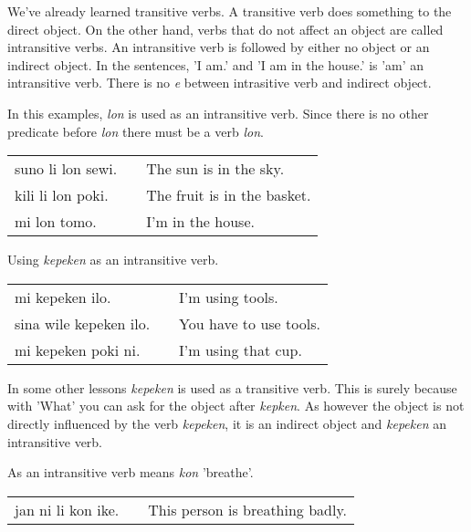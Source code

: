 We've already learned transitive verbs. 
A transitive verb does something to the direct object. 
On the other hand, verbs that do not affect an object are called intransitive verbs. 
An intransitive verb is followed by either no object or an indirect object. 
In the sentences, 'I am.' and 'I am in the house.' is 'am' an intransitive verb. 
There is no \textit{e} between intrasitive verb and indirect object.

%
In this examples, \textit{lon} is used as an intransitive verb. 
Since there is no other predicate before \textit{lon} there must be a verb \textit{lon}.

\begin{supertabular}{p{5,5cm}|ll}
suno li lon sewi. && The sun is in the sky. \\
kili li lon poki. && The fruit is in the basket. \\
mi lon tomo. && I'm in the house. \\
\end{supertabular} 

%
Using \textit{kepeken} as an intransitive verb.
 
\begin{supertabular}{p{5,5cm}|ll}
mi kepeken ilo. && I'm using tools. \\
sina wile kepeken ilo. && You have to use tools. \\
mi kepeken poki ni. && I'm using that cup. \\
\end{supertabular} 

In some other lessons \textit{kepeken} is used as a transitive verb.
This is surely because with 'What' you can ask for the object after \textit{kepken}. 
As however the object is not directly influenced by the verb \textit{kepeken}, it is an indirect object and \textit{kepeken} an intransitive verb. 

%
As an intransitive verb means \textit{kon} 'breathe'.

\begin{supertabular}{p{5,5cm}|ll}
jan ni li kon ike. && This person is breathing badly. \\
\end{supertabular}

